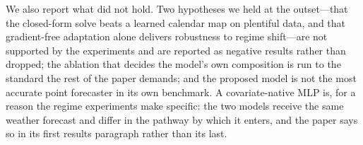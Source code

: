 We also report what did not hold. Two hypotheses we held at the outset---that the closed-form
solve beats a learned calendar map on plentiful data, and that gradient-free adaptation alone
delivers robustness to regime shift---are not supported by the experiments and are reported
as negative results rather than dropped; the ablation that decides the model's own
composition is run to the standard the rest of the paper demands; and the proposed model is
not the most accurate point forecaster in its own benchmark. A covariate-native MLP is, for a
reason the regime experiments make specific: the two models receive the same weather forecast
and differ in the pathway by which it enters, and the paper says so in its first results
paragraph rather than its last.
